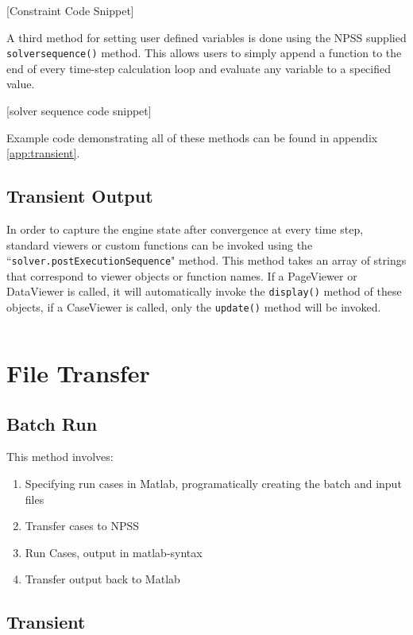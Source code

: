 \documentclass[heading.tex]{subfiles}
\begin{document}
 [Constraint Code Snippet]
 
 A third method for setting user defined variables is done using the NPSS supplied \texttt{solversequence()} method. This allows users to simply append a function to the end of every time-step calculation loop and evaluate any variable to a specified value.
 
 [solver sequence code snippet]
 
Example code demonstrating all of these methods can be found in appendix \cref{app:transient}.

\subsection{Transient Output}

In order to capture the engine state after convergence at every time step, standard viewers or custom functions can be
invoked using the ``\texttt{solver.postExecutionSequence}" method. This method takes an array of strings that
correspond to viewer objects or function names. If a PageViewer or DataViewer is called, it will automatically invoke the
\texttt{display()} method of these objects, if a CaseViewer is called, only the \texttt{update()} method will be invoked.

\begin{adjustwidth}{-1cm}{-1cm}
 \inputminted[]{c++}{code/transient1}
 \end{adjustwidth} 

\section{File Transfer}
\subsection{Batch Run}
This method involves:

\begin{enumerate}
  \item Specifying run cases in Matlab, programatically creating the batch and input files
  \item Transfer cases to NPSS
  \item Run Cases, output in matlab-syntax
  \item Transfer output back to Matlab
\end{enumerate}

\subsection{Transient}
\end{document}
